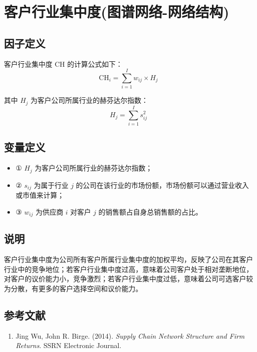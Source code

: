 \documentclass{article}
\begin{document}
\section{客户行业集中度(图谱网络-网络结构)}

\subsection{因子定义}


客户行业集中度 \( \mathrm{CH} \) 的计算公式如下：
\begin{equation}
    \mathrm{CH}_i = \sum_{i=1}^{I} w_{ij} \times H_j
\end{equation}

其中 \( H_j \) 为客户公司所属行业的赫芬达尔指数：
\begin{equation}
    H_j = \sum_{i=1}^{I} s_{ij}^2
\end{equation}

\subsection{变量定义}
\begin{itemize}
    \item ① \( H_j \) 为客户公司所属行业的赫芬达尔指数；
    \item ② \( s_{ij} \) 为属于行业 \( j \) 的公司在该行业的市场份额，市场份额可以通过营业收入或市值来计算；
    \item ③ \( w_{ij} \) 为供应商 \( i \) 对客户 \( j \) 的销售额占自身总销售额的占比。
\end{itemize}

\subsection{说明}
客户行业集中度为公司所有客户所属行业集中度的加权平均，反映了公司在其客户行业中的竞争地位；若客户行业集中度过高，意味着公司客户处于相对垄断地位，对客户的议价能力小，竞争激烈；若客户行业集中度过低，意味着公司可选客户较为分散，有更多的客户选择空间和议价能力。

\subsection{参考文献}
\begin{enumerate}
    \item Jing Wu, John R. Birge. (2014). \textit{Supply Chain Network Structure and Firm Returns}. SSRN Electronic Journal.
\end{enumerate}
\end{document}
